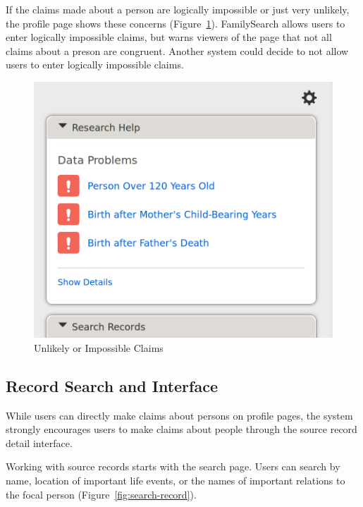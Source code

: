 \documentclass[format=siggraph, review=true]{acmart}
\begin{document}
If the claims made about a person are logically impossible or just
very unlikely, the profile page shows these concerns
(Figure~\ref{fig:data-problems}). FamilySearch allows users to
enter logically impossible claims, but warns viewers of the
page that not all claims about a preson are congruent. Another system could
decide to not allow users to enter logically impossible claims.

\begin{figure}[h]
\includegraphics[width=\columnwidth]{images/familysearch/data_problems_detail.png}
\caption{Unlikely or Impossible Claims}
\label{fig:data-problems}
\end{figure}

\subsection{Record Search and Interface}
While users can directly make claims about persons on profile pages,
the system strongly encourages users to make claims about people
through the source record detail interface.

Working with source records starts with the search page. Users can
search by name, location of important life events, or the names of
important relations to the focal person
(Figure~\ref{fig:search-record}).
\end{document}
